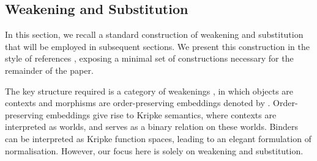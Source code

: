 



\subsection{Weakening and Substitution}
In this section, we recall a standard construction of weakening and
substitution that will be employed in subsequent sections. We present this
construction in the style of references \cite{par-sub2,intrinsic1,intrinsic2},
exposing a minimal set of constructions necessary for the remainder of the
paper.

The key structure required is a category of weakenings \cite{ope-cat}, in which
objects are contexts and morphisms are order-preserving embeddings denoted by
. Order-preserving embeddings
give rise to Kripke semantics, where contexts are interpreted as worlds, and
 serves as a binary relation on these worlds. Binders can be interpreted
as Kripke function spaces, leading to an elegant formulation \cite{intrinsic3}
of normalisation. However, our focus here is solely on weakening and
substitution.

